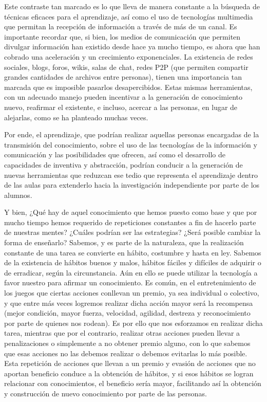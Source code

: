 Este contraste tan marcado es lo que lleva de manera constante a la búsqueda de técnicas eficaces para el aprendizaje, así como el uso de tecnologías multimedia que permitan la recepción de información a través de más de un canal. Es importante recordar que, si bien, los medios de comunicación que permiten divulgar información han existido desde hace ya mucho tiempo, es ahora que han cobrado una aceleración y un crecimiento exponenciales. La existencia de redes sociales, blogs, foros, wikis, salas de chat, redes P2P (que permiten compartir grandes cantidades de archivos entre personas), tienen una importancia tan marcada que es imposible pasarlos desapercibidos. Estas mismas herramientas, con un adecuado manejo pueden incentivar a la generación de conocimiento nuevo, reafirmar el existente, e incluso, acercar a las personas, en lugar de alejarlas, como se ha planteado muchas veces.

Por ende, el aprendizaje, que podrían realizar aquellas personas encargadas de la transmisión del conocimiento, sobre el uso de las tecnologías de la información y comunicación y las posibilidades que ofrecen, así como el desarrollo de capacidades de inventiva y abstracción, podrían conducir a la generación de nuevas herramientas que reduzcan ese tedio que representa el aprendizaje dentro de las aulas para extenderlo hacia la investigación independiente por parte de los alumnos.

Y bien, ¿Qué hay de aquel conocimiento que hemos puesto como base y que por mucho tiempo hemos requerido de repeticiones constantes a fin de hacerlo parte de nuestras mentes? ¿Cuáles podrían ser las estrategias? ¿Será posible cambiar la forma de enseñarlo? Sabemos, y es parte de la naturaleza, que la realización constante de una tarea se convierte en hábito, costumbre y hasta en ley. Sabemos de la existencia de hábitos buenos y malos, hábitos fáciles y difíciles de adquirir o de erradicar, según la circunstancia. Aún en ello se puede utilizar la tecnología a favor nuestro para afirmar un conocimiento. Es común, en el entretenimiento de los juegos que ciertas acciones conllevan un premio, ya sea individual o colectivo, y que entre más veces logremos realizar dicha acción mayor será la recompensa (mejor condición, mayor fuerza, velocidad, agilidad, destreza y reconocimiento por parte de quienes nos rodean). Es por ello que nos esforzamos en realizar dicha tarea, mientras que por el contrario, realizar otras acciones pueden llevar a penalizaciones o simplemente a no obtener premio alguno, con lo que sabemos que esas acciones no las debemos realizar o debemos evitarlas lo más posible. Esta repetición de acciones que llevan a un premio y evasión de acciones que no aportan beneficio conduce a la obtención de hábitos, y si esos hábitos se logran relacionar con conocimientos, el beneficio sería mayor, facilitando así la obtención y construcción de nuevo conocimiento por parte de las personas.

